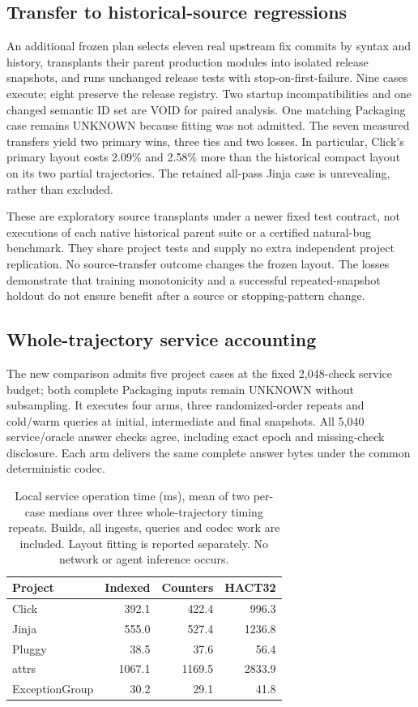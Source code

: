 \subsection{Transfer to historical-source regressions}
An additional frozen plan selects eleven real upstream fix commits by
syntax and history, transplants their parent production modules into
isolated release snapshots, and runs unchanged release tests with
stop-on-first-failure. Nine cases execute; eight preserve the release
registry. Two startup incompatibilities and one changed semantic ID set
are VOID for paired analysis. One matching Packaging case remains UNKNOWN
because fitting was not admitted. The seven measured transfers yield
two primary wins, three ties and two losses. In particular, Click's
primary layout costs 2.09\% and 2.58\% more than the historical compact layout
on its two partial trajectories. The retained all-pass Jinja case is
unrevealing, rather than excluded.

These are exploratory source transplants under a newer fixed test contract,
not executions of each native historical parent suite or a certified
natural-bug benchmark. They share project tests and supply no extra
independent project replication. No source-transfer outcome changes the
frozen layout. The losses demonstrate that training monotonicity and a
successful repeated-snapshot holdout do not ensure benefit after a source
or stopping-pattern change.

\subsection{Whole-trajectory service accounting}
The new comparison admits five project cases at the fixed 2,048-check
service budget; both complete Packaging inputs remain UNKNOWN without
subsampling. It executes four arms, three randomized-order repeats and
cold/warm queries at initial, intermediate and final snapshots.
All 5,040 service/oracle answer checks agree,
including exact epoch and missing-check disclosure. Each arm delivers the
same complete answer bytes under the common deterministic codec.

\begin{table}[t]\centering\footnotesize
\caption{Local service operation time (ms), mean of two per-case medians over
three whole-trajectory timing repeats. Builds, all ingests, queries and
codec work are included. Layout fitting is reported separately.
No network or agent inference occurs.}\label{tab:v11-time}
\begin{tabular}{@{}lrrr@{}}\toprule
Project & Indexed & Counters & HACT32\\\midrule
Click & 392.1 & 422.4 & 996.3 \\
Jinja & 555.0 & 527.4 & 1236.8 \\
Pluggy & 38.5 & 37.6 & 56.4 \\
attrs & 1067.1 & 1169.5 & 2833.9 \\
ExceptionGroup & 30.2 & 29.1 & 41.8 \\
\bottomrule\end{tabular}
\end{table}

